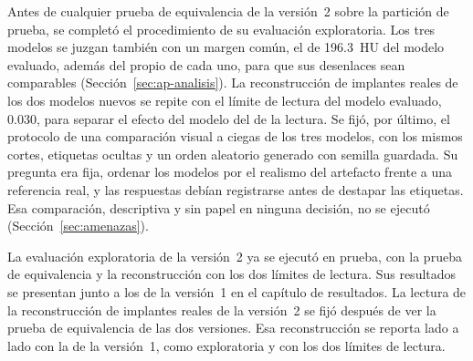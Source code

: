Antes de cualquier prueba de equivalencia de la versión~2 sobre la partición de prueba, se completó el procedimiento de su evaluación exploratoria. Los tres modelos se juzgan también con un margen común, el de 196.3~HU del modelo evaluado, además del propio de cada uno, para que sus desenlaces sean comparables (Sección~\ref{sec:ap-analisis}). La reconstrucción de implantes reales de los dos modelos nuevos se repite con el límite de lectura del modelo evaluado, 0.030, para separar el efecto del modelo del de la lectura. Se fijó, por último, el protocolo de una comparación visual a ciegas de los tres modelos, con los mismos cortes, etiquetas ocultas y un orden aleatorio generado con semilla guardada. Su pregunta era fija, ordenar los modelos por el realismo del artefacto frente a una referencia real, y las respuestas debían registrarse antes de destapar las etiquetas. Esa comparación, descriptiva y sin papel en ninguna decisión, no se ejecutó (Sección~\ref{sec:amenazas}).

La evaluación exploratoria de la versión~2 ya se ejecutó en prueba, con la prueba de equivalencia y la reconstrucción con los dos límites de lectura. Sus resultados se presentan junto a los de la versión~1 en el capítulo de resultados. La lectura de la reconstrucción de implantes reales de la versión~2 se fijó después de ver la prueba de equivalencia de las dos versiones. Esa reconstrucción se reporta lado a lado con la de la versión~1, como exploratoria y con los dos límites de lectura.



